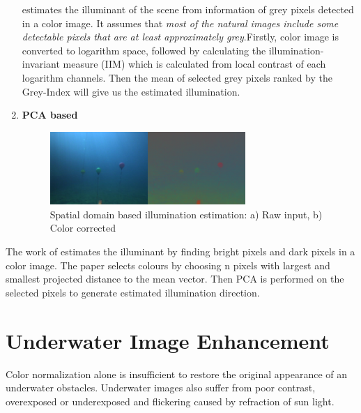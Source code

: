 \documentclass[fypca]{socreport}
\begin{document}
\begin{enumerate}
 estimates the illuminant of the scene from
information of grey pixels detected in a color image. It assumes that
\textit{most of the natural images include some detectable pixels that are at
  least approximately grey}.Firstly, color image is converted to logarithm
space, followed by calculating the illumination-invariant measure (IIM) which is
calculated from local contrast of each logarithm channels. Then the mean of
selected grey pixels ranked by the Grey-Index will give us the estimated illumination.

\item \textbf{PCA based} \\

\begin{figure}[H]
\centering
  \includegraphics[width=0.7\textwidth, height=0.2\textheight]{spatialcolorconstancy.png}
  \caption{Spatial domain based illumination estimation: a) Raw input, b)
    Color corrected}
  \label{fig:spatial_colorconstancy}
\end{figure}
\end{enumerate}

The work of  estimates the illuminant by finding
bright pixels and dark pixels in a color image. The paper selects colours by
choosing n pixels with largest and smallest projected distance to the mean
vector. Then PCA is performed on the selected pixels to generate estimated
illumination direction.

\section{Underwater Image Enhancement}

Color normalization alone is insufficient to restore the original appearance of
an underwater obstacles. Underwater images also suffer from poor contrast,
overexposed or underexposed and flickering caused by refraction of sun light.
\end{document}
